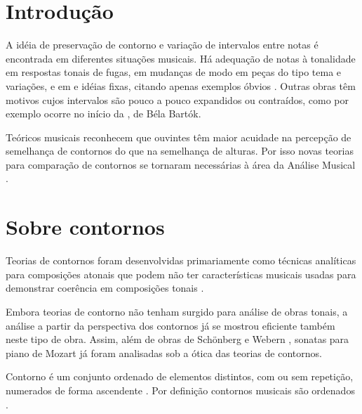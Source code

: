 \chapter{Introdução}
\label{cha:introducao}

A idéia de preservação de contorno e variação de intervalos entre
notas é encontrada em diferentes situações musicais. Há adequação de
notas à tonalidade em respostas tonais de fugas, em mudanças de modo
em peças do tipo tema e variações, e em  e idéias
fixas, citando apenas exemplos óbvios
\cite[p. 29]{morris87:composition}. Outras obras têm motivos cujos
intervalos são pouco a pouco expandidos ou contraídos, como por
exemplo ocorre no início da , de Béla Bartók.

Teóricos musicais reconhecem que ouvintes têm maior acuidade na
percepção de semelhança de contornos do que na semelhança de
alturas. Por isso novas teorias para comparação de contornos se
tornaram necessárias à área da Análise Musical
\cite[p. 226]{marvin.ea87:relating}.

\chapter{Sobre contornos}
\label{cha:sobre-contornos}



Teorias de contornos foram desenvolvidas primariamente como técnicas
analíticas para composições atonais que podem não ter características
musicais usadas para demonstrar coerência em composições tonais
\cite[p. 1]{beard03:contour}.

Embora teorias de contorno não tenham surgido para análise de obras
tonais, a análise a partir da perspectiva dos contornos já se mostrou
eficiente também neste tipo de obra. Assim, além de obras de Schönberg
\cite{friedmann85:methodology} e Webern \cite{clifford95:contour},
sonatas para piano de Mozart \cite{beard03:contour} já foram
analisadas sob a ótica das teorias de contornos.

Contorno é um conjunto ordenado de elementos distintos, com ou sem
repetição, numerados de forma ascendente
\cite[p. 206]{morris93:directions}. Por definição contornos musicais
são ordenados \cite[p. 228]{marvin.ea87:relating}.

